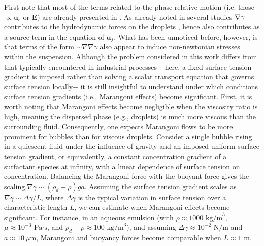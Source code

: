 First note that most of the terms related to the phase relative motion (i.e. those $\propto \textbf{u}_r$ or $\textbf{E}$) are already presented in \citet[Appendix B]{zhang1997momentum}. 
As already noted in several studies $\mathbf{\nabla} \gamma$ contributes to the hydrodynamic forces on the droplets \citep{Subramanian_1985}, hence also contributes as a source term in the equation of $\textbf{u}_f$. 
What has been unnoticed before, however, is that terms of the form $\sim \nabla\nabla \gamma$ also appear to induce non-newtonian stresses within the suspension.
Although the problem considered in this work differs from that typically encountered in industrial processes $-$here, a fixed surface tension gradient is imposed rather than solving a scalar transport equation that governs surface tension locally$-$ it is still insightful to understand under which conditions surface tension gradients (i.e., Marangoni effects) become significant.
First, it is worth noting that Marangoni effects become negligible when the viscosity ratio is high, meaning the dispersed phase (e.g., droplets) is much more viscous than the surrounding fluid. Consequently, one expects Marangoni flows to be more prominent for bubbles than for viscous droplets. 
Consider a single bubble rising in a quiescent fluid under the influence of gravity and an imposed uniform surface tension gradient, or equivalently, a constant concentration gradient of a surfactant species at infinity, with a linear dependence of surface tension on concentration. 
Balancing the Marangoni force with the buoyant force gives the scaling,$\nabla \gamma \sim (\rho_d - \rho) g a$.
Assuming the surface tension gradient scales as $\nabla \gamma \sim \Delta \gamma / L$, where $\Delta \gamma $ is the typical variation in surface tension over a characteristic length $L$, we can estimate when Marangoni effects become significant.
For instance, in an aqueous emulsion (with $\rho \approx 1000 \text{ kg/m}^3$, $\mu \approx 10^{-3} \text{ Pa·s}$, and $\rho_d - \rho \approx 100 \text{ kg/m}^3$), and assuming $\Delta \gamma \approx 10^{-2} \text{ N/m}$ and $a \approx 10\ \mu\text{m}$, Marangoni and buoyancy forces become comparable when $L \approx 1 \text{ m}$. 
